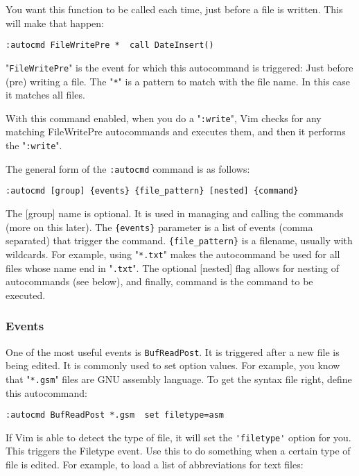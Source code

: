 {You want this function to be called each time, just before a file is written.
This will make that happen:

\begin{Verbatim}[samepage=true]
 :autocmd FileWritePre *  call DateInsert()
\end{Verbatim}

"\verb!FileWritePre!" is the event for which this autocommand is triggered: Just before (pre) writing a file.
The "\verb!*!" is a pattern to match with the file name.
In this case it matches all files.

With this command enabled, when you do a "\verb!:write!", Vim checks for any matching FileWritePre autocommands and executes them, and then it performs the "\verb!:write!".

The general form of the \verb!:autocmd! command is as follows:

\begin{Verbatim}[samepage=true]
 :autocmd [group] {events} {file_pattern} [nested] {command}
\end{Verbatim}

The [group] name is optional.
It is used in managing and calling the commands (more on this later).
The \verb!{events}! parameter is a list of events (comma separated) that trigger the command.
\verb!{file_pattern}! is a filename, usually with wildcards.
For example, using "\verb!*.txt!" makes the autocommand be used for all files whose name end in "\verb!.txt!".
The optional [nested] flag allows for nesting of autocommands (see below), and finally, {command} is the command to be executed.

\subsubsection{Events}
One of the most useful events is \verb!BufReadPost!.
It is triggered after a new file is being edited.
It is commonly used to set option values.
For example, you know that "\verb!*.gsm!" files are GNU assembly language.
To get the syntax file right, define this autocommand:

\begin{Verbatim}[samepage=true]
 :autocmd BufReadPost *.gsm  set filetype=asm
\end{Verbatim}

If Vim is able to detect the type of file, it will set the \verb!'filetype'! option for you.
This triggers the Filetype event.
Use this to do something when a certain type of file is edited.
For example, to load a list of abbreviations for text files:

}
